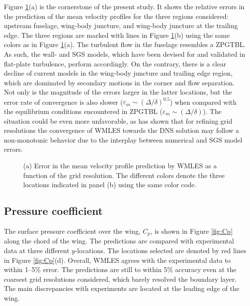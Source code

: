 \documentclass{ctr}
\begin{document}
Figure \ref{fig:Errors_all}(a) is the cornerstone of the present
study. It shows the relative errors in the prediction of the mean
velocity profiles for the three regions considered: upstream fuselage,
wing-body juncture, and wing-body juncture at the trailing edge. The
three regions are marked with lines in Figure \ref{fig:Errors_all}(b)
using the same colors as in Figure \ref{fig:Errors_all}(a).  The
turbulent flow in the fuselage resembles a ZPGTBL. As such, the wall-
and SGS models, which have been devised for and validated in
flat-plate turbulence, perform accordingly.  On the contrary, there is
a clear decline of current models in the wing-body juncture and
trailing edge region, which are dominated by secondary motions in the
corner and flow separation. Not only is the magnitude of the errors
larger in the latter locations, but the error rate of convergence is
also slower ($\varepsilon_m\sim(\Delta/\delta)^{0.5}$) when compared
with the equilibrium conditions encountered in ZPGTBL
($\varepsilon_m\sim(\Delta/\delta)$). The situation could be even more
unfavorable, as \cite{Lozano2019a} has shown that for refining grid
resolutions the convergence of WMLES towards the DNS solution may
follow a non-monotonic behavior due to the interplay between numerical
and SGS model errors.
%
\begin{figure}
\begin{center}
\end{center}
\caption{(a) Error in the mean velocity profile prediction by WMLES as
  a function of the grid resolution. The different colors denote the
  three locations indicated in panel (b) using the same color
  code.\label{fig:Errors_all}}
\end{figure}

\subsection{Pressure coefficient}\label{subsec:pressure}

The surface pressure coefficient over the wing, $C_p$, is shown in
Figure \ref{fig:Cp} along the chord of the wing. The predictions are
compared with experimental data at three different $y$-locations. The
locations selected are denoted by red lines in Figure
\ref{fig:Cp}(d). Overall, WMLES agrees with the experimental data to
within 1--5\% error. The predictions are still to within 5\% accuracy
even at the coarsest grid resolutions considered, which barely
resolved the boundary layer. The main discrepancies with experiments
are located at the leading edge of the wing.
\end{document}
